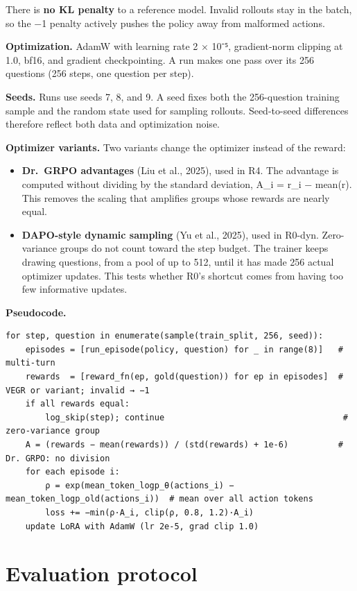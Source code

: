There is \textbf{no KL penalty} to a reference model. Invalid rollouts
stay in the batch, so the −1 penalty actively pushes the policy away
from malformed actions.

\textbf{Optimization.} AdamW with learning rate 2 × 10⁻⁵, gradient-norm
clipping at 1.0, bf16, and gradient checkpointing. A run makes one pass
over its 256 questions (256 steps, one question per step).

\textbf{Seeds.} Runs use seeds 7, 8, and 9. A seed fixes both the
256-question training sample and the random state used for sampling
rollouts. Seed-to-seed differences therefore reflect both data and
optimization noise.

\textbf{Optimizer variants.} Two variants change the optimizer instead
of the reward:

\begin{itemize}
\tightlist
\item
  \textbf{Dr.~GRPO advantages} (Liu et al., 2025), used in R4. The
  advantage is computed without dividing by the standard deviation, A\_i
  = r\_i − mean(r). This removes the scaling that amplifies groups whose
  rewards are nearly equal.
\item
  \textbf{DAPO-style dynamic sampling} (Yu et al., 2025), used in
  R0-dyn. Zero-variance groups do not count toward the step budget. The
  trainer keeps drawing questions, from a pool of up to 512, until it
  has made 256 actual optimizer updates. This tests whether R0's
  shortcut comes from having too few informative updates.
\end{itemize}

\textbf{Pseudocode.}

\begin{Verbatim}
for step, question in enumerate(sample(train_split, 256, seed)):
    episodes = [run_episode(policy, question) for _ in range(8)]   # multi-turn
    rewards  = [reward_fn(ep, gold(question)) for ep in episodes]  # VEGR or variant; invalid → −1
    if all rewards equal:
        log_skip(step); continue                                    # zero-variance group
    A = (rewards − mean(rewards)) / (std(rewards) + 1e-6)          # Dr. GRPO: no division
    for each episode i:
        ρ = exp(mean_token_logp_θ(actions_i) − mean_token_logp_old(actions_i))  # mean over all action tokens
        loss += −min(ρ·A_i, clip(ρ, 0.8, 1.2)·A_i)
    update LoRA with AdamW (lr 2e-5, grad clip 1.0)
\end{Verbatim}

\section{Evaluation protocol}\label{sec:3.7}


